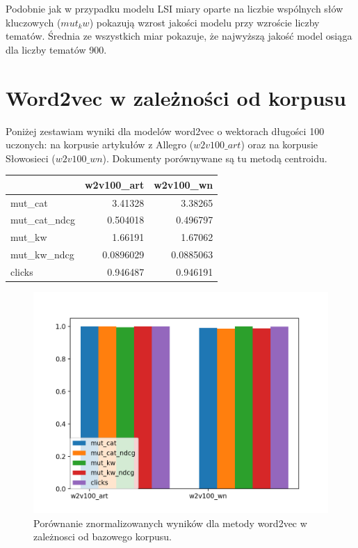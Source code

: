 \documentclass[pl]{minipw} %
\begin{document}
Podobnie jak w przypadku modelu LSI miary oparte na liczbie wspólnych słów kluczowych ($mut_kw$) pokazują wzrost jakości modelu przy wzroście liczby tematów. Średnia ze wszystkich miar pokazuje, że najwyższą jakość model osiąga dla liczby tematów 900.


\section{Word2vec w zależności od korpusu}

Poniżej zestawiam wyniki dla modelów word2vec o wektorach długości 100 uczonych: na korpusie artykułów z Allegro ($w2v100\_art$) oraz na korpusie Słowosieci ($w2v100\_wn$). Dokumenty porównywane są tu metodą centroidu.

\begin{center}
	\begin{tabular}{lrr}
		\hline
		&   w2v100\_art &   w2v100\_wn \\
		\hline
		mut\_cat      &    3.41328   &   3.38265   \\
		mut\_cat\_ndcg &    0.504018  &   0.496797  \\
		mut\_kw       &    1.66191   &   1.67062   \\
		mut\_kw\_ndcg  &    0.0896029 &   0.0885063 \\
		clicks       &    0.946487  &   0.946191  \\
		\hline
	\end{tabular}
\end{center}

\begin{figure}[H]
	\centering
	\includegraphics[width=1\textwidth]{img/results/w2v100_art_w2v100_wn_.png}
	\caption{Porównanie znormalizowanych wyników dla metody word2vec w zależnosci od bazowego korpusu.}
\end{figure}
\end{document}
